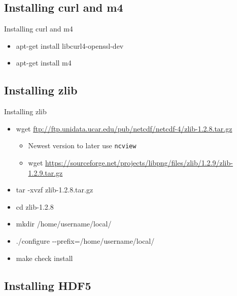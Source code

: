 \documentclass[compress,11pt,xcolor=svgnames,aspectratio=169]{beamer}
\begin{document}
\subsection{Installing curl and m4}

\begin{frame}[fragile]{Installing curl and m4}

\begin{itemize}
\setlength\itemsep{0.6cm}

  \item apt-get install libcurl4-openssl-dev
  \item apt-get install m4

\end{itemize}

\end{frame}

\subsection{Installing zlib}

\begin{frame}[fragile]{Installing zlib}

\begin{itemize}
\setlength\itemsep{0.3cm}

  \item {\footnotesize wget \url{ftp://ftp.unidata.ucar.edu/pub/netcdf/netcdf-4/zlib-1.2.8.tar.gz}}
  \begin{itemize}
    \item Newest version to later use \texttt{ncview}
    \item {\scriptsize wget \url{https://sourceforge.net/projects/libpng/files/zlib/1.2.9/zlib-1.2.9.tar.gz}}
  \end{itemize}
  \item tar -xvzf zlib-1.2.8.tar.gz
  \item cd zlib-1.2.8
  \item mkdir /home/username/local/
  \item ./configure {-}{-}prefix=/home/username/local/
  \item make check install

\end{itemize}

\end{frame}

\subsection{Installing HDF5}
\end{document}
